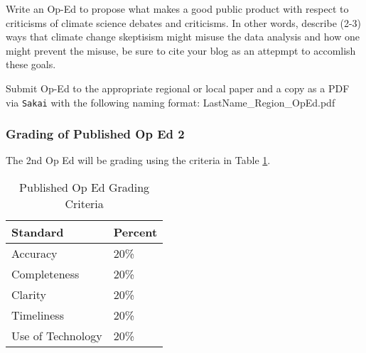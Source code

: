 Write an Op-Ed to propose what makes a good public product with respect to criticisms of climate science debates and criticisms. In other words, describe (2-3) ways that climate change skeptisism might misuse the data analysis and how one might prevent the misuse, be sure to cite your blog as an attepmpt to accomlish these goals. 

Submit Op-Ed to the appropriate regional or local paper and a copy as a PDF via \texttt{Sakai} with the following naming format: LastName\_Region\_OpEd.pdf



\subsubsection{Grading of Published Op Ed 2}

The 2nd Op Ed will be grading using the criteria in Table \ref{tab:oped2grading}.

\begin{table}[h]
\centering
\caption{Published Op Ed Grading Criteria}
\label{tab:oped2grading}
\begin{tabular}{ll}\hline
Standard            & Percent \\ \hline\hline    
Accuracy            & 20\%  \\
Completeness        & 20\% \\
Clarity             & 20\% \\
Timeliness          & 20\% \\
Use of Technology   & 20\% \\ \hline
\end{tabular}
\end{table}




